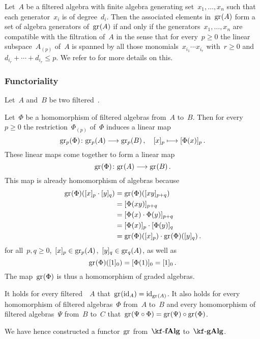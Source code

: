 \begin{remark}
	Let~$A$ be a filtered algebra with finite algebra generating set~$x_1, \dotsc, x_n$ such that each generator~$x_i$ is of degree~$d_i$.
	Then the associated elements in~$\gr(A)$ form a set of algebra generators of~$\gr(A)$ if and only if the generators~$x_1, \dotsc, x_n$ are compatible with the filtration of~$A$ in the sense that for every~$p \geq 0$ the linear subspace~$A_{(p)}$ of~$A$ is spanned by all those monomials~$x_{i_1} \dotsm x_{i_r}$ with~$r \geq 0$ and~$d_{i_r} + \dotsb + d_{i_r} \leq p$.
	We refer to \cite{associated_generated} for more details on this.
\end{remark}

\subsubsection{Functoriality}

\begin{construction}
	Let~$A$ and~$B$ be two filtered~\algebra{$\kf$}.
	
	Let~$\Phi$ be a homomorphism of filtered algebras from~$A$ to~$B$.
	Then for every~$p \geq 0$ the restriction~$\Phi_{(p)}$ of~$\Phi$ induces a linear map
	\[
		\gr[p](\Phi)
		\colon
		\gr[p](A)
		\to
		\gr[p](B) \,,
		\quad
		\fclass{x}_p
		\mapsto
		\fclass{ \Phi(x) }_p  \,.
	\]
	These linear maps come together to form a linear map
	\[
		\gr(\Phi)
		\colon
		\gr(A)
		\to
		\gr(B)  \,.
		\label{associated graded algebra on morphisms}
	\]
	This map is already homomorphism of algebras because
	\begin{align*}
		\gr(\Phi)( \fclass{x}_p \cdot \fclass{y}_q )
		&=
		\gr(\Phi)( \fclass{xy}_{p+q} )
		\\
		&=
		\fclass{ \Phi(xy) }_{p+q}
		\\
		&=
		\fclass{ \Phi(x) \cdot \Phi(y) }_{p+q}
		\\
		&=
		\fclass{ \Phi(x) }_p \cdot \fclass{ \Phi(y) }_q
		\\
		&=
		\gr(\Phi)(\fclass{x}_p) \cdot \gr(\Phi)(\fclass{y}_q) \,.
	\end{align*}
	for all~$p, q \geq 0$,~$\fclass{x}_p \in \gr[p](A)$,~$\fclass{y}_q \in \gr[q](A)$, as well as
	\[
		\gr(\Phi)( \fclass{1}_0 )
		=
		\fclass{ \Phi(1) }_0
		=
		\fclass{ 1 }_0 \,.
	\]
	The map~$\gr(\Phi)$ is thus a homomorphism of graded algebras.

	It holds for every filtered~\algebra{$\kf$}~$A$ that~$\gr(\id_A) = \id_{\gr(A)}$.
	It also holds for every homomorphism of filtered algebras~$\Phi$ from~$A$ to~$B$ and every homomorphism of filtered algebras~$\Psi$ from~$B$ to~$C$ that~$\gr(\Psi \circ \Phi) = \gr(\Psi) \circ \gr(\Phi)$.
	
	We have hence constructed a functor~$\gr$ from~$\cfAlg{\kf}$ to~$\cgAlg{\kf}$.
\end{construction}


